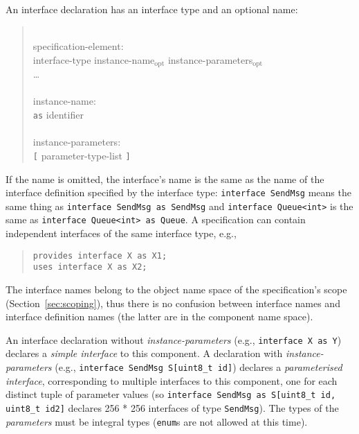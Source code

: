 \documentclass[11pt,letterpaper]{article}
\newcommand{\kw}[1]{{\tt #1}}
\newcommand{\code}[1]{{\tt #1}}
\newcommand{\opt}{$_{\mbox{opt}}$\xspace}
\newcommand{\grammarshift}{\vspace*{-.7cm}}
\newcommand{\grammarindent}{\hspace*{2cm}\= \\ \kill}
\begin{document}
An interface declaration has an interface type and an optional name:
\begin{quote} \grammarshift \em \begin{tabbing}
\grammarindent
specification-element:\\
\>	interface-type instance-name\opt instance-parameters\opt\\
\>	\ldots\\
\\
instance-name:\\
\>	\kw{as} identifier\\
\\
instance-parameters:\\
\>	\kw{[} parameter-type-list \kw{]}
\end{tabbing} \end{quote}
If the name is omitted, the interface's name is the same as the name of the
interface definition specified by the interface type: \code{interface
SendMsg} means the same thing as \code{interface SendMsg as SendMsg} and
\code{interface Queue<int>} is the same as \code{interface Queue<int> as
Queue}. A specification can contain independent interfaces of the
same interface type, e.g., 
\begin{quote}
  \begin{verbatim}
provides interface X as X1; 
uses interface X as X2;
  \end{verbatim}
\end{quote}
The interface names belong to the object name space of the specification's
scope (Section~\ref{sec:scoping}), thus there is no confusion between
interface names and interface definition names (the latter are in the
component name space).

An interface declaration without \emph{instance-parameters} (e.g.,
\code{interface X as Y}) declares a \emph{simple interface} to this
component. A declaration with \emph{instance-parameters} (e.g.,
\code{interface SendMsg S[uint8\_t id]}) declares a \emph{parameterised
interface}, corresponding to multiple interfaces to this component, one for
each distinct tuple of parameter values (so \code{interface SendMsg as
S[uint8\_t id, uint8\_t id2]} declares 256 * 256 interfaces of type
\code{SendMsg}). The types of the \emph{parameters} must be integral types
(\kw{enum}s are not allowed at this time).
\end{document}
